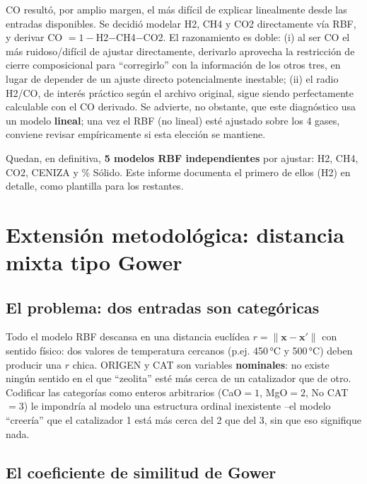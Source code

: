 \documentclass[11pt,a4paper]{article}
\begin{document}
CO result\'o, por amplio margen, el m\'as dif\'icil de explicar linealmente
desde las entradas disponibles. Se decidi\'o modelar H2, CH4 y CO2
directamente v\'ia RBF, y derivar CO $=1-$H2$-$CH4$-$CO2. El razonamiento es
doble: (i) al ser CO el m\'as ruidoso/dif\'icil de ajustar directamente,
derivarlo aprovecha la restricci\'on de cierre composicional para
``corregirlo'' con la informaci\'on de los otros tres, en lugar de depender
de un ajuste directo potencialmente inestable; (ii) el radio H2/CO, de
inter\'es pr\'actico seg\'un el archivo original, sigue siendo perfectamente
calculable con el CO derivado. Se advierte, no obstante, que este
diagn\'ostico usa un modelo \textbf{lineal}; una vez el RBF (no lineal) est\'e
ajustado sobre los 4 gases, conviene revisar emp\'iricamente si esta elecci\'on
se mantiene.

Quedan, en definitiva, \textbf{5 modelos RBF independientes} por ajustar:
H2, CH4, CO2, CENIZA y \% S\'olido. Este informe documenta el primero de
ellos (H2) en detalle, como plantilla para los restantes.

\section{Extensi\'on metodol\'ogica: distancia mixta tipo Gower}
\label{sec:gower}

\subsection{El problema: dos entradas son categ\'oricas}

Todo el modelo RBF descansa en una distancia eucl\'idea
$r=\lVert\mathbf x-\mathbf x'\rVert$ con sentido f\'isico: dos valores de
temperatura cercanos (p.ej. 450\,°C y 500\,°C) deben producir una $r$ chica.
ORIGEN y CAT son variables \textbf{nominales}: no existe ning\'un sentido en
el que ``zeolita'' est\'e m\'as cerca de un catalizador que de otro. Codificar
las categor\'ias como enteros arbitrarios (CaO$=1$, MgO$=2$, No CAT$=3$) le
impondr\'ia al modelo una estructura ordinal inexistente --el modelo
``creer\'ia'' que el catalizador 1 est\'a m\'as cerca del 2 que del 3, sin que
eso signifique nada.

\subsection{El coeficiente de similitud de Gower}
\end{document}
